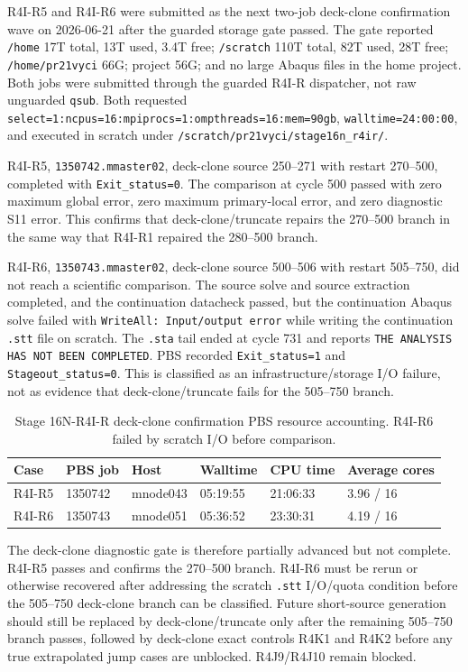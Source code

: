 \documentclass[11pt,a4paper]{article}
\newcommand{\code}[1]{\texttt{#1}}
\begin{document}
R4I-R5 and R4I-R6 were submitted as the next two-job deck-clone confirmation wave on 2026-06-21 after the guarded storage gate passed. The gate reported \code{/home} 17T total, 13T used, 3.4T free; \code{/scratch} 110T total, 82T used, 28T free; \code{/home/pr21vyci} 66G; project 56G; and no large Abaqus files in the home project. Both jobs were submitted through the guarded R4I-R dispatcher, not raw unguarded \code{qsub}. Both requested \code{select=1:ncpus=16:mpiprocs=1:ompthreads=16:mem=90gb}, \code{walltime=24:00:00}, and executed in scratch under \code{/scratch/pr21vyci/stage16n\_r4ir/}.

R4I-R5, \code{1350742.mmaster02}, deck-clone source 250--271 with restart 270--500, completed with \code{Exit\_status=0}. The comparison at cycle 500 passed with zero maximum global error, zero maximum primary-local error, and zero diagnostic S11 error. This confirms that deck-clone/truncate repairs the 270--500 branch in the same way that R4I-R1 repaired the 280--500 branch.

R4I-R6, \code{1350743.mmaster02}, deck-clone source 500--506 with restart 505--750, did not reach a scientific comparison. The source solve and source extraction completed, and the continuation datacheck passed, but the continuation Abaqus solve failed with \code{WriteAll: Input/output error} while writing the continuation \code{.stt} file on scratch. The \code{.sta} tail ended at cycle 731 and reports \code{THE ANALYSIS HAS NOT BEEN COMPLETED}. PBS recorded \code{Exit\_status=1} and \code{Stageout\_status=0}. This is classified as an infrastructure/storage I/O failure, not as evidence that deck-clone/truncate fails for the 505--750 branch.

\begin{table}[H]
\centering
\small
\begin{tabular}{llllll}
\toprule
Case & PBS job & Host & Walltime & CPU time & Average cores \\
\midrule
R4I-R5 & 1350742 & mnode043 & 05:19:55 & 21:06:33 & 3.96 / 16 \\
R4I-R6 & 1350743 & mnode051 & 05:36:52 & 23:30:31 & 4.19 / 16 \\
\bottomrule
\end{tabular}
\caption{Stage 16N-R4I-R deck-clone confirmation PBS resource accounting. R4I-R6 failed by scratch I/O before comparison.}
\end{table}

The deck-clone diagnostic gate is therefore partially advanced but not complete. R4I-R5 passes and confirms the 270--500 branch. R4I-R6 must be rerun or otherwise recovered after addressing the scratch \code{.stt} I/O/quota condition before the 505--750 deck-clone branch can be classified. Future short-source generation should still be replaced by deck-clone/truncate only after the remaining 505--750 branch passes, followed by deck-clone exact controls R4K1 and R4K2 before any true extrapolated jump cases are unblocked. R4J9/R4J10 remain blocked.
\end{document}
